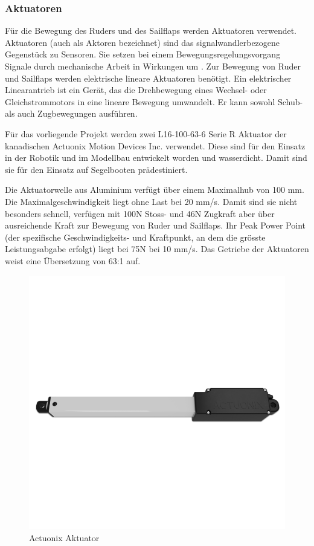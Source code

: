 \subsubsection{Aktuatoren}
Für die Bewegung des Ruders und des Sailflaps werden Aktuatoren verwendet. Aktuatoren (auch als Aktoren bezeichnet) sind das signalwandlerbezogene Gegenstück zu Sensoren. Sie setzen bei einem Bewegungsregelungsvorgang Signale durch mechanische Arbeit in Wirkungen um \cite{noauthor_aktor_2023}. Zur Bewegung von Ruder und Sailflaps werden elektrische lineare Aktuatoren benötigt. Ein elektrischer Linearantrieb ist ein Gerät, das die Drehbewegung eines Wechsel- oder Gleichstrommotors in eine lineare Bewegung umwandelt. Er kann sowohl Schub- als auch Zugbewegungen ausführen.

Für das vorliegende Projekt werden zwei L16-100-63-6 Serie R Aktuator der kanadischen Actuonix Motion Devices Inc. verwendet. Diese sind für den Einsatz in der Robotik und im Modellbau entwickelt worden und wasserdicht. Damit sind sie für den Einsatz auf Segelbooten prädestiniert.

Die Aktuatorwelle aus Aluminium verfügt über einem Maximalhub von 100 mm. Die Maximalgeschwindigkeit liegt ohne Last bei 20 mm/s. Damit sind sie nicht besonders schnell, verfügen mit 100N Stoss- und 46N Zugkraft aber über ausreichende Kraft zur Bewegung von Ruder und Sailflaps. Ihr Peak Power Point (der spezifische Geschwindigkeits- und Kraftpunkt, an dem die grösste Leistungsabgabe erfolgt) liegt bei 75N bei 10 mm/s. Das Getriebe der Aktuatoren weist eine Übersetzung von 63:1 auf.

\begin{figure}
    \centering
    \includegraphics[width=0.75\linewidth]{actuonix.png}
    \caption{Actuonix Aktuator}
    \label{fig:actuator}
\end{figure}

